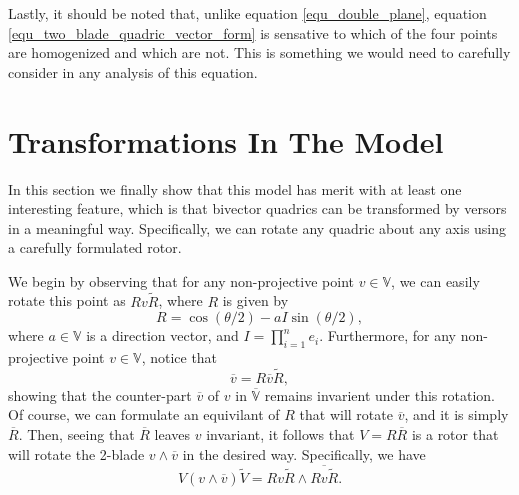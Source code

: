 \documentclass[12pt]{article}
\newcommand{\V}{\mathbb{V}}
\numberwithin{equation}{section}
\begin{document}
Lastly, it should be noted that, unlike equation \eqref{equ_double_plane},
equation \eqref{equ_two_blade_quadric_vector_form} is sensative to which
of the four points are homogenized and which are not.  This is something
we would need to carefully consider in any analysis of this equation.


\section{Transformations In The Model}

In this section we finally show that this model has merit with at least one
interesting feature, which is that bivector quadrics can be transformed by
versors in a meaningful way.  Specifically, we can rotate any quadric about
any axis using a carefully formulated rotor.

We begin by observing that for any non-projective point $v\in\V$,
we can easily rotate this point as $Rv\tilde{R}$, where $R$ is
given by
\begin{equation}
R = \cos(\theta/2) - aI\sin(\theta/2),
\end{equation}
where $a\in\V$ is a direction vector, and $I=\prod_{i=1}^n e_i$.  Furthermore,
for any non-projective point $v\in\V$, notice that
\begin{equation}
\overline{v} = R\overline{v}\tilde{R},
\end{equation}
showing that the counter-part $\overline{v}$ of $v$ in $\overline{\V}$ remains invarient
under this rotation.  Of course, we can formulate an equivilant of $R$
that will rotate $\overline{v}$, and it is simply $\overline{R}$.  Then, seeing
that $\overline{R}$ leaves $v$ invariant, it follows
that $V=R\overline{R}$ is a rotor that will rotate the 2-blade
$v\wedge\overline{v}$ in the desired way.  Specifically, we have
\begin{equation}
V(v\wedge\overline{v})\tilde{V} = Rv\tilde{R}\wedge\overline{Rv\tilde{R}}.
\end{equation}
\end{document}
